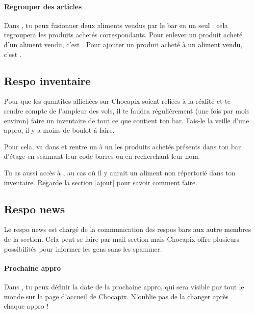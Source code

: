 \documentclass[12pt,french]{article}
\begin{document}
\paragraph{Regrouper des articles} Dans , tu peux fusionner deux aliments vendus par le bar en un seul : cela regroupera les produits achetés correspondants. Pour enlever un produit acheté d'un aliment vendu, c'est . Pour ajouter un produit acheté à un aliment vendu, c'est .

\subsection{Respo inventaire}

Pour que les quantités affichées sur Chocapix soient reliées à la réalité et te rendre compte de l'ampleur des vols, il te faudra régulièrement (une fois par mois environ) faire un inventaire de tout ce que contient ton bar. Fais-le la veille d'une appro, il y a moins de boulot à faire.

Pour cela, va dans  et rentre un à un les produits achetés présents dans ton bar d'étage en scannant leur code-barres ou en recherchant leur nom.

Tu as aussi accès à , au cas où il y aurait un aliment non répertorié dans ton inventaire. Regarde la section \ref{ajout} pour savoir comment faire.

\subsection{Respo news}

Le respo news est chargé de la communication des respos bars aux autre membres de la section. Cela peut se faire par mail section mais Chocapix offre plusieurs possibilités pour informer les gens sans les spammer.

\paragraph{Prochaine appro} Dans , tu peux définir la date de la prochaine appro, qui sera visible par tout le monde sur la page d'accueil de Chocapix. N'oublie pas de la changer après chaque appro !
\end{document}
